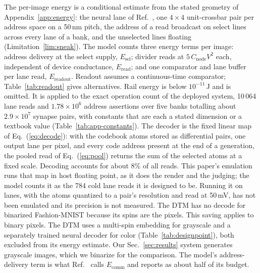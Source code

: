 \documentclass[reprint,amsmath,amssymb,aps,nofootinbib]{revtex4-2}
\begin{document}
The per-image energy is a conditional estimate from the stated geometry
of Appendix~\ref{app:energy}: the neural lane of
Ref.~\cite{knowm2026blog}, one $4 \times 4$ unit-crossbar pair per
address space on a 50\,nm pitch, the address of a read broadcast on
select lines across every lane of a bank, and the unselected lines
floating (Limitation~\ref{lim:sneak}). The model counts three energy terms per image: address delivery at the
select supply, $E_{\mathrm{sel}}$; divider reads at
$5\,C_{\mathrm{node}} V^2$ each, independent of device conductance,
$E_{\mathrm{read}}$; and one comparator and lane buffer per lane read,
$E_{\mathrm{readout}}$. Readout assumes a continuous-time comparator;
Table~\ref{tab:readout} gives alternatives. Rail energy is below
$10^{-11}$\,J and is omitted. It is applied to the exact operation count of the
deployed system, 10\,064 lane reads and $1.78\times10^{6}$ address
assertions over five banks totalling about $2.9\times10^{7}$ synapse
pairs, with constants that are each a stated dimension or a textbook
value (Table~\ref{tab:app-constants}).  The decoder is the fixed linear map of Eq.~(\ref{eq:decode}): with the codebook atoms stored as differential
pairs, one output lane per pixel, and every code address present at
the end of a generation, the pooled read of Eq.~(\ref{eq:pool})
returns the sum of the selected atoms at a fixed scale. Decoding
accounts for about 8\% of all reads. This paper's emulation runs that map in host
floating point, as it does the render and the judging; the model
counts it as the 784 cold lane reads it is designed to be. Running it
on lanes, with the atoms quantized to a pair's resolution and read at
50\,mV, has not been emulated and its precision is not measured. The
DTM has no decode for binarized Fashion-MNIST because its spins are
the pixels. This saving applies to binary pixels. The DTM uses a multi-spin
embedding for grayscale and a separately trained neural decoder for
color (Table~\ref{tab:designpoint}), both excluded from its energy
estimate. Our Sec.~\ref{sec:results} system generates grayscale images,
which we binarize for the comparison. The model's address-delivery term is
what Ref.~\cite{jelincic2025dtm} calls $E_{\mathrm{comm}}$ and
reports as about half of its budget.
\end{document}
